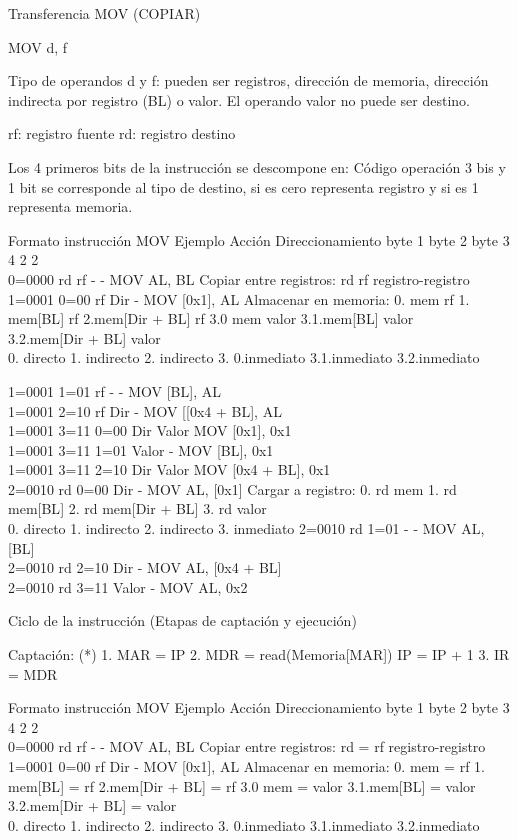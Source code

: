 \documentclass[12pt,twoside]{templates/unerthesis}
\begin{document}
Transferencia MOV (COPIAR)

MOV d, f

Tipo de operandos d y f: pueden ser registros, dirección de memoria, dirección indirecta por registro (BL) o valor. El operando valor no puede ser destino.

rf: registro fuente
rd: registro destino

Los 4 primeros bits de la instrucción se descompone en:
Código operación 3 bis y 1 bit se corresponde al tipo de destino, si es cero representa registro y si es 1 representa memoria.

Formato instrucción MOV Ejemplo Acción Direccionamiento
byte 1 byte 2 byte 3\\
4 2 2\\
0=0000 rd rf - - MOV AL, BL Copiar entre registros: rd rf registro-registro
1=0001 0=00 rf Dir - MOV {[}0x1{]}, AL Almacenar en memoria:
0. mem rf
1. mem{[}BL{]} rf
2.mem{[}Dir + BL{]} rf
3.0 mem valor
3.1.mem{[}BL{]} valor\\
3.2.mem{[}Dir + BL{]} valor\\
0. directo
1. indirecto
2. indirecto
3. 0.inmediato
3.1.inmediato
3.2.inmediato

1=0001 1=01 rf - - MOV {[}BL{]}, AL\\
1=0001 2=10 rf Dir - MOV {[}{[}0x4 + BL{]}, AL\\
1=0001 3=11 0=00 Dir Valor MOV {[}0x1{]}, 0x1\\
1=0001 3=11 1=01 Valor - MOV {[}BL{]}, 0x1\\
1=0001 3=11 2=10 Dir Valor MOV {[}0x4 + BL{]}, 0x1\\
2=0010 rd 0=00 Dir - MOV AL, {[}0x1{]} Cargar a registro:
0. rd mem
1. rd mem{[}BL{]}
2. rd mem{[}Dir + BL{]}
3. rd valor\\
0. directo
1. indirecto
2. indirecto
3. inmediato
2=0010 rd 1=01 - - MOV AL, {[}BL{]}\\
2=0010 rd 2=10 Dir - MOV AL, {[}0x4 + BL{]}\\
2=0010 rd 3=11 Valor - MOV AL, 0x2

Ciclo de la instrucción (Etapas de captación y ejecución)

Captación: (*)
1. MAR = IP
2. MDR = read(Memoria{[}MAR{]})
IP = IP + 1
3. IR = MDR

Formato instrucción MOV Ejemplo Acción Direccionamiento
byte 1 byte 2 byte 3\\
4 2 2\\
0=0000 rd rf - - MOV AL, BL Copiar entre registros: rd = rf registro-registro
1=0001 0=00 rf Dir - MOV {[}0x1{]}, AL Almacenar en memoria:
0. mem = rf
1. mem{[}BL{]} = rf
2.mem{[}Dir + BL{]} = rf
3.0 mem = valor
3.1.mem{[}BL{]} = valor\\
3.2.mem{[}Dir + BL{]} = valor\\
0. directo
1. indirecto
2. indirecto
3. 0.inmediato
3.1.inmediato
3.2.inmediato
\end{document}
